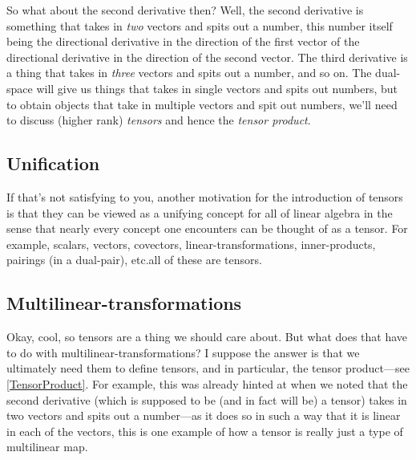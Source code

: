 So what about the second derivative then?  Well, the second derivative is something that takes in \emph{two} vectors and spits out a number, this number itself being the directional derivative in the direction of the first vector of the directional derivative in the direction of the second vector.  The third derivative is a thing that takes in \emph{three} vectors and spits out a number, and so on.  The dual-space will give us things that takes in single vectors and spits out numbers, but to obtain objects that take in multiple vectors and spit out numbers, we'll need to discuss (higher rank) \emph{tensors} and hence the \emph{tensor product}.

\subsection{Unification}

If that's not satisfying to you, another motivation for the introduction of tensors is that they can be viewed as a unifying concept for all of linear algebra in the sense that nearly every concept one encounters can be thought of as a tensor.  For example, scalars, vectors, covectors, linear-transformations, inner-products, pairings (in a dual-pair), etc.\textellipsis all of these are tensors.

\subsection{Multilinear-transformations}

Okay, cool, so tensors are a thing we should care about.  But what does that have to do with multilinear-transformations?  I suppose the answer is that we ultimately need them to define tensors, and in particular, the tensor product---see \cref{TensorProduct}.  For example, this was already hinted at when we noted that the second derivative (which is supposed to be (and in fact will be) a tensor) takes in two vectors and spits out a number---as it does so in such a way that it is linear in each of the vectors, this is one example of how a tensor is really just a type of multilinear map.

